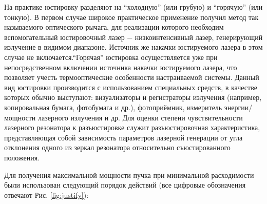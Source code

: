 \documentclass[twocolumn]{article}
\begin{document}
На практике юстировку разделяют на ``холодную'' (или грубую) и ``горячую'' (или
тонкую). В первом случае широкое практическое применение
получил метод так называемого оптического рычага, для реализации
которого необходим вспомогательный юстировочный лазер − низкоинтенсивный
лазер, генерирующий излучение в видимом диапазоне. Источник же накачки
юстируемого лазера в этом случае не включается.``Горячая''
юстировка осуществляется уже при непосредственном включении источника
накачки юстируемого лазера, что позволяет учесть термооптические
особенности настраиваемой системы. Данный вид юстировки производится с
использованием специальных средств, в качестве которых обычно выступают:
визуализаторы и регистраторы излучения (например, копировальная бумага,
фотобумага и др.), фотоприёмник, измеритель энергии/мощности лазерного
излучения и др. Для оценки степени чувствительности лазерного
резонатора к разъюстировке служит разъюстировочная характеристика,
представляющая собой зависимость параметров лазерной генерации от угла
отклонения одного из зеркал резонатора относительно съюстированного
положения.

Для получения максимальной мощности пучка при минимальной расходимости
были использован следующий порядок действий (все цифровые обозначения отвечают Рис. \ref{fig:justify}):
\end{document}
